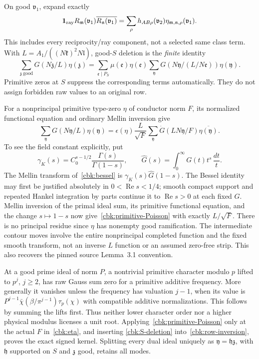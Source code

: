 On good $\mathfrak v_1$, expand exactly
\[
 \mathbf1_{\rm ray}R_{\mathfrak m}(\mathfrak v_1)
       \overline{R_{\mathfrak n}(\mathfrak v_1)}
   =\sum_\rho h_{AB\rho}(\mathfrak v_2)\eta_{\mathfrak m,\mathfrak n,\rho}
                                                    (\mathfrak v_1).
\]
This includes every reciprocity/ray component, not a selected same
class term. With $L=A_1/((N\mathfrak k)^2N\mathfrak l)$, good-$S$
deletion is the \emph{finite} identity
\begin{equation}\label{cbk:S-deletion}
 \sum_{\mathfrak z\ \mathrm{good}}G(N\mathfrak z/L)\eta(\mathfrak z)
 =\sum_{\mathfrak e\mid P_S}\mu(\mathfrak e)\eta(\mathfrak e)
       \sum_{\mathfrak y}G(N\mathfrak y/(L/N\mathfrak e))\eta(\mathfrak y).
\end{equation}
Primitive zeros at $S$ suppress the corresponding terms automatically.
They do not assign forbidden raw values to an original row.

For a nonprincipal primitive type-zero $\eta$ of conductor norm $F$,
its normalized functional equation and ordinary Mellin inversion give
\begin{equation}\label{cbk:primitive-Poisson}
 \sum_{\mathfrak y}G(N\mathfrak y/L)\eta(\mathfrak y)
 =\epsilon(\eta)\frac L{\sqrt F}
      \sum_{\mathfrak y}\dot G(LN\mathfrak y/F)
                                      \overline{\eta(\mathfrak y)}.
\end{equation}
To see the field constant explicitly, put
\[
 \gamma_K(s)=C_0^{s-1/2}\frac{\Gamma(s)}{\Gamma(1-s)},\qquad
 \widehat G(s)=\int_0^\infty G(t)t^s\,\frac{dt}{t}.
\]
The Mellin transform of~\eqref{cbk:bessel} is
$\gamma_K(s)\widehat G(1-s)$. The Bessel identity may first be
justified absolutely in $0<\operatorname{Re}s<1/4$; smooth compact
support and repeated Hankel integration by parts continue it to
$\operatorname{Re}s>0$ at each fixed $G$. Mellin inversion of the
primal ideal sum, its primitive functional equation, and the change
$s\mapsto1-s$ now give~\eqref{cbk:primitive-Poisson} with exactly
$L/\sqrt F$. There is no principal residue since $\eta$ has nonempty
good ramification. The intermediate contour moves involve the
entire nonprincipal completed function and the fixed smooth
transform, not an inverse $L$ function or an assumed zero-free strip.
This also recovers the pinned source Lemma~3.1 convention.

At a good prime ideal of norm $P$, a nontrivial primitive character
modulo $p$ lifted to $p^j$, $j\ge2$, has raw Gauss sum zero for a
primitive additive frequency. More generally it vanishes unless the
frequency has valuation $j-1$, when its value is
$P^{j-1}\bar\chi(\beta/\pi^{j-1})\tau_p(\chi)$ with compatible
additive normalizations. This follows by summing the lifts first.
Thus neither lower character order nor a higher physical modulus
licenses a unit root. Applying~\eqref{cbk:primitive-Poisson} only at
the actual $F$ in~\eqref{cbk:eta}, and inserting
\eqref{cbk:S-deletion} into~\eqref{cbk:row-inversion}, proves the exact
signed kernel. Splitting every dual ideal uniquely as
$\mathfrak y=\mathfrak h\mathfrak z$, with $\mathfrak h$ supported
on $S$ and $\mathfrak z$ good, retains all modes.

